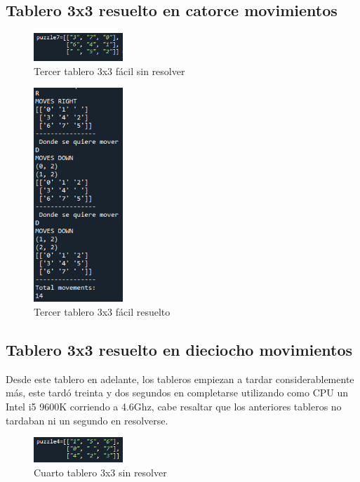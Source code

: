 \documentclass{article}
\begin{document}
    \subsection{Tablero 3x3 resuelto en catorce movimientos}
        \begin{figure}[H]
        \centering
        \includegraphics[width=0.3\textwidth]{puzzles/puzzle3.PNG}
        \caption{Tercer tablero 3x3 fácil sin resolver}
        \label{fig:ger}
        \end{figure}
        
        \begin{figure}[H]
        \centering
        \includegraphics[width=0.3\textwidth]{puzzles/puzzle3Solved.PNG}
        \caption{Tercer tablero 3x3 fácil resuelto}
        \label{fig:ger}
        \end{figure}
        
    \subsection{Tablero 3x3 resuelto en dieciocho movimientos}
    Desde este tablero en adelante, los tableros empiezan a tardar considerablemente más, este tardó treinta y dos segundos en completarse utilizando como CPU un Intel i5 9600K corriendo a 4.6Ghz, cabe resaltar que los anteriores tableros no tardaban ni un segundo en resolverse.
        \begin{figure}[H]
        \centering
        \includegraphics[width=0.3\textwidth]{puzzles/puzzle4.PNG}
        \caption{Cuarto tablero 3x3 sin resolver}
        \label{fig:ger}
        \end{figure}
        
\end{document}
